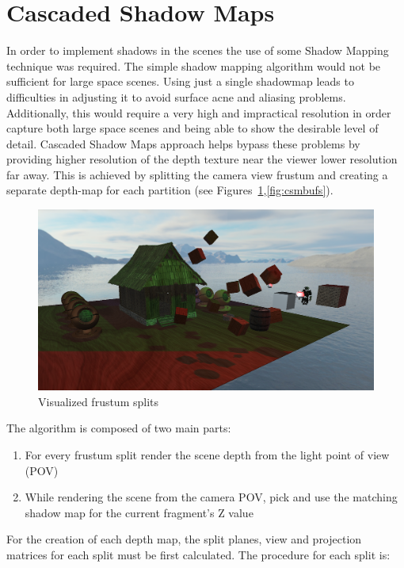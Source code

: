 \section{Cascaded Shadow Maps}

In order to implement shadows in the scenes the use of some Shadow Mapping technique was required.
The simple shadow mapping algorithm would not be sufficient for large space scenes. Using just
a single shadowmap leads to difficulties in adjusting it to avoid surface acne and aliasing
problems. Additionally, this would require a very high and impractical resolution in order capture both large
space scenes and being able to show the desirable level of detail. Cascaded Shadow Maps approach
helps bypass these problems by providing higher resolution of the depth texture near the viewer lower
resolution far away. This is achieved by splitting the camera view frustum and creating a separate depth-map
for each partition (see Figures~\ref{fig:csmsplits},\ref{fig:csmbufs}).

\begin{figure}[h]
    \centering
    \includegraphics[scale=0.25, clip=true]{./image/csmsplits.png}
    \caption{Visualized frustum splits}
\label{fig:csmsplits}
\end{figure}

The algorithm is composed of two main parts:
\begin{enumerate}
\item For every frustum split render the scene depth from the light point of view (POV)
\item While rendering the scene from the camera POV, pick and use the matching shadow map for the current
    fragment's Z value
\end{enumerate}

For the creation of each depth map, the split planes, view and projection matrices for each split
must be first calculated. The procedure for each split is:

